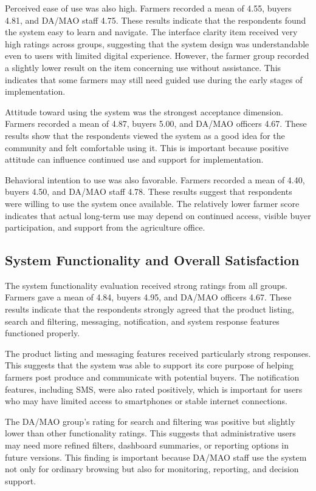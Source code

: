 Perceived ease of use was also high. Farmers recorded a mean of 4.55, buyers 4.81, and DA/MAO staff 4.75. These results indicate that the respondents found the system easy to learn and navigate. The interface clarity item received very high ratings across groups, suggesting that the system design was understandable even to users with limited digital experience. However, the farmer group recorded a slightly lower result on the item concerning use without assistance. This indicates that some farmers may still need guided use during the early stages of implementation.

Attitude toward using the system was the strongest acceptance dimension. Farmers recorded a mean of 4.87, buyers 5.00, and DA/MAO officers 4.67. These results show that the respondents viewed the system as a good idea for the community and felt comfortable using it. This is important because positive attitude can influence continued use and support for implementation.

Behavioral intention to use was also favorable. Farmers recorded a mean of 4.40, buyers 4.50, and DA/MAO staff 4.78. These results suggest that respondents were willing to use the system once available. The relatively lower farmer score indicates that actual long-term use may depend on continued access, visible buyer participation, and support from the agriculture office.

\subsection{System Functionality and Overall Satisfaction}

The system functionality evaluation received strong ratings from all groups. Farmers gave a mean of 4.84, buyers 4.95, and DA/MAO officers 4.67. These results indicate that the respondents strongly agreed that the product listing, search and filtering, messaging, notification, and system response features functioned properly.

The product listing and messaging features received particularly strong responses. This suggests that the system was able to support its core purpose of helping farmers post produce and communicate with potential buyers. The notification features, including SMS, were also rated positively, which is important for users who may have limited access to smartphones or stable internet connections.

The DA/MAO group's rating for search and filtering was positive but slightly lower than other functionality ratings. This suggests that administrative users may need more refined filters, dashboard summaries, or reporting options in future versions. This finding is important because DA/MAO staff use the system not only for ordinary browsing but also for monitoring, reporting, and decision support.

